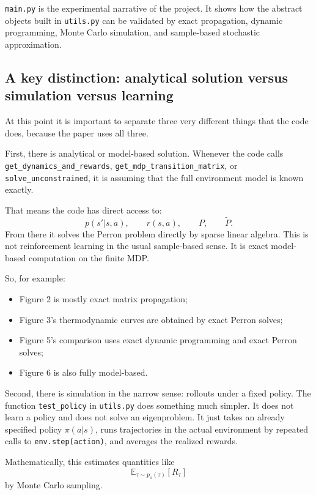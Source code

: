 \documentclass[11pt]{article}
\begin{document}
\medskip
\texttt{main.py} is the experimental narrative of the project. It shows how the abstract
objects built in \texttt{utils.py} can be validated by exact propagation, dynamic programming,
Monte Carlo simulation, and sample-based stochastic approximation.

\subsection*{A key distinction: analytical solution versus simulation versus learning}

At this point it is important to separate three very different things that the code does,
because the paper uses all three.

First, there is analytical or model-based solution.
Whenever the code calls
\texttt{get\_dynamics\_and\_rewards},
\texttt{get\_mdp\_transition\_matrix},
or
\texttt{solve\_unconstrained},
it is assuming that the full environment model is known exactly.

That means the code has direct access to:
\begin{equation}
    p(s'|s,a), \qquad r(s,a), \qquad P, \qquad \widetilde{P}.
\end{equation}
From there it solves the Perron problem directly by sparse linear algebra. This is not
reinforcement learning in the usual sample-based sense. It is exact model-based computation on
the finite MDP.

So, for example:
\begin{itemize}
    \item Figure 2 is mostly exact matrix propagation;
    \item Figure 3's thermodynamic curves are obtained by exact Perron solves;
    \item Figure 5's comparison uses exact dynamic programming and exact Perron solves;
    \item Figure 6 is also fully model-based.
\end{itemize}

Second, there is simulation in the narrow sense: rollouts under a fixed policy.
The function \texttt{test\_policy} in \texttt{utils.py} does something much simpler. It does
not learn a policy and does not solve an eigenproblem. It just takes an already specified
policy \(\pi(a|s)\), runs trajectories in the actual environment by repeated calls to
\texttt{env.step(action)}, and averages the realized rewards.

Mathematically, this estimates quantities like
\begin{equation}
    \mathbb{E}_{\tau \sim p_\pi(\tau)}[R_\tau]
\end{equation}
by Monte Carlo sampling.
\end{document}
